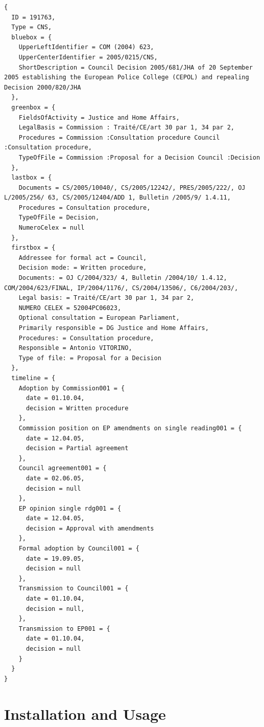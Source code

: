 \documentclass{scrartcl}
\begin{document}
\begin{verbatim}
{
  ID = 191763,
  Type = CNS,
  bluebox = {
    UpperLeftIdentifier = COM (2004) 623,
    UpperCenterIdentifier = 2005/0215/CNS,
    ShortDescription = Council Decision 2005/681/JHA of 20 September 2005 establishing the European Police College (CEPOL) and repealing Decision 2000/820/JHA
  },
  greenbox = {
    FieldsOfActivity = Justice and Home Affairs,
    LegalBasis = Commission : Traité/CE/art 30 par 1, 34 par 2,
    Procedures = Commission :Consultation procedure Council :Consultation procedure,
    TypeOfFile = Commission :Proposal for a Decision Council :Decision
  },
  lastbox = {
    Documents = CS/2005/10040/, CS/2005/12242/, PRES/2005/222/, OJ L/2005/256/ 63, CS/2005/12404/ADD 1, Bulletin /2005/9/ 1.4.11,
    Procedures = Consultation procedure,
    TypeOfFile = Decision,
    NumeroCelex = null
  },
  firstbox = {
    Addressee for formal act = Council,
    Decision mode: = Written procedure,
    Documents: = OJ C/2004/323/ 4, Bulletin /2004/10/ 1.4.12, COM/2004/623/FINAL, IP/2004/1176/, CS/2004/13506/, C6/2004/203/,
    Legal basis: = Traité/CE/art 30 par 1, 34 par 2,
    NUMERO CELEX = 52004PC06023,
    Optional consultation = European Parliament,
    Primarily responsible = DG Justice and Home Affairs,
    Procedures: = Consultation procedure,
    Responsible = Antonio VITORINO,
    Type of file: = Proposal for a Decision
  },
  timeline = {
    Adoption by Commission001 = {
      date = 01.10.04,
      decision = Written procedure
    },
    Commission position on EP amendments on single reading001 = {
      date = 12.04.05,
      decision = Partial agreement
    },
    Council agreement001 = {
      date = 02.06.05,
      decision = null
    },
    EP opinion single rdg001 = {
      date = 12.04.05,
      decision = Approval with amendments
    },
    Formal adoption by Council001 = {
      date = 19.09.05,
      decision = null
    },
    Transmission to Council001 = {
      date = 01.10.04,
      decision = null,
    },
    Transmission to EP001 = {
      date = 01.10.04,
      decision = null
    }
  }
}
\end{verbatim}



\section{Installation and Usage}
\end{document}
